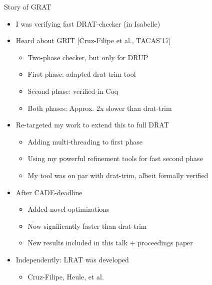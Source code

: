 \documentclass[fleqn]{beamer}
\begin{document}
\begin{frame}{Story of GRAT}
  \begin{itemize}
   \item<+-> I was verifying fast DRAT-checker (in Isabelle)
   \item<+-> Heard about GRIT [Cruz-Filipe et al., TACAS'17]
    \begin{itemize}
     \item Two-phase checker, but only for DRUP
     \item First phase: adapted drat-trim tool
     \item Second phase: verified in Coq
     \item Both phases: Approx. 2x slower than drat-trim
    \end{itemize}
   \item<+-> Re-targeted my work to extend this to full DRAT
    \begin{itemize}
     \item Adding multi-threading to first phase
     \item Using my powerful refinement tools for fast second phase
     \item My tool was on par with drat-trim, albeit formally verified
    \end{itemize}
   \item<+-> After CADE-deadline
    \begin{itemize}
     \item Added novel optimizations
     \item Now significantly faster than drat-trim
     \item New results included in this talk + proceedings paper
    \end{itemize}
   \item<+-> Independently: LRAT was developed
    \begin{itemize}
     \item Cruz-Filipe, Heule, et al.
      
    
    \end{itemize}
  \end{itemize}
\end{frame}
\end{document}
